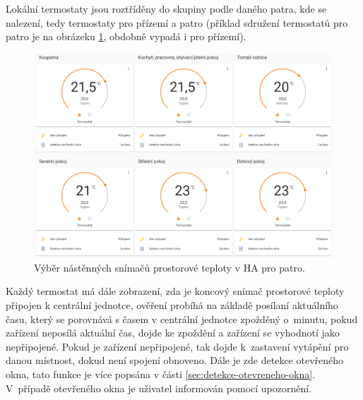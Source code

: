 Lokální termostaty jsou roztříděny do skupiny podle daného patra, kde se nalezení, tedy termostaty pro přízemí a patro (příklad sdružení termostatů pro patro je na obrázeku \ref{fig:prehled-lokalnich-termostaty-patro}, obdobně vypadá i pro přízemí).

\begin{figure}[H]
    \centering
    \includegraphics[width=\textwidth]{images/software-ha/prehled-lokalnich-termostaty-patro.png}
    \caption{Výběr nástěnných snímačů prostorové teploty v HA pro patro.}
    \label{fig:prehled-lokalnich-termostaty-patro}
\end{figure}

Každý termostat má dále zobrazení, zda je koncový snímač prostorové teploty připojen k centrální jednotce, ověření probíhá na základě posílaní aktuálního času, který se porovnává s časem v centrální jednotce zpožděný o~minutu, pokud zařízení neposílá aktuální čas, dojde ke zpoždění a zařízení se vyhodnotí jako nepřipojené. Pokud je zařízení nepřipojené, tak dojde k~zastavení vytápění pro danou místnost, dokud není spojení obnoveno. Dále je zde detekce otevřeného okna, tato funkce je více popsána v části \ref{sec:detekce-otevreneho-okna}. V~případě otevřeného okna je uživatel informován pomocí upozornění. 



